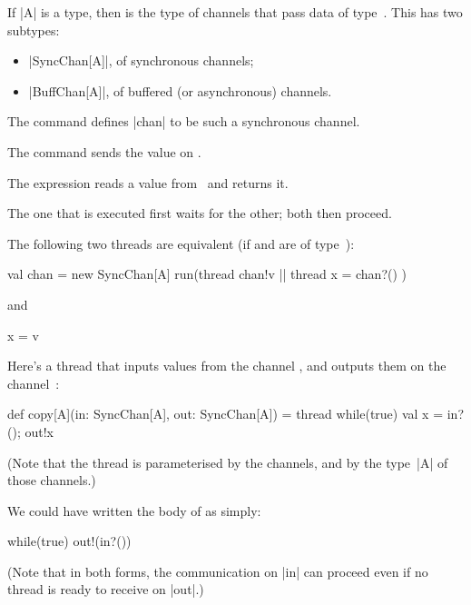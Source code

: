 \documentclass[notes,color]{sepslide0}
\begin{document}

\begin{slide}

If |A| is a type, then  is the type of channels that pass data
of type~.  This has two subtypes:
%
\begin{itemize}
\item |SyncChan[A]|, of synchronous channels; 

\item |BuffChan[A]|, of buffered (or asynchronous) channels.
\end{itemize}

The command  defines |chan| to be such a
synchronous channel.

The command  sends the value  on .

The expression  reads a value from~ and returns it.

The one that is executed first waits for the other; both then proceed.
\end{slide}


\begin{slide}

The following two threads are equivalent (if  and  are
of type~): 
\begin{scala}
  { 
    val chan = new SyncChan[A]
    run(thread{ chan!v } || thread{ x = chan?() }) 
  }
\end{scala}
and
\begin{scala}
  x = v 
\end{scala}
\end{slide}



\begin{slide}

Here's a thread that inputs values from the channel , and outputs
them on the channel~:
%
\begin{scala}
def copy[A](in: SyncChan[A], out: SyncChan[A]) = thread{
  while(true){ val x = in?(); out!x }
}
\end{scala}
%
(Note that the thread is parameterised by the channels, and by the type~|A|
of those channels.)

We could have written the body of  as simply:
\begin{scala}
  while(true) out!(in?()) 
\end{scala}
(Note that in both forms, the communication on |in| can proceed even if no
thread is ready to receive on |out|.)
\end{slide}
\end{document}

